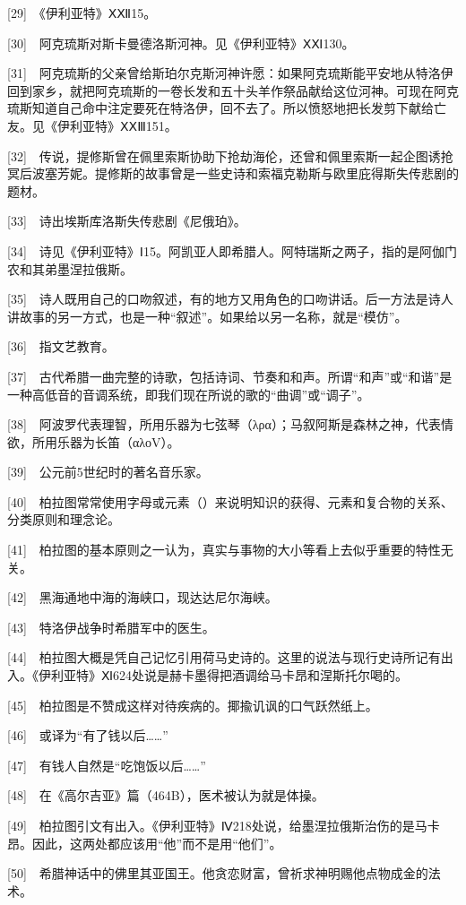 \documentclass[12pt,oneside]{book}
\begin{document}
[29]　《伊利亚特》ⅩⅫ15。

[30]　阿克琉斯对斯卡曼德洛斯河神。见《伊利亚特》ⅩⅪ130。

[31]　阿克琉斯的父亲曾给斯珀尔克斯河神许愿：如果阿克琉斯能平安地从特洛伊回到家乡，就把阿克琉斯的一卷长发和五十头羊作祭品献给这位河神。可现在阿克琉斯知道自己命中注定要死在特洛伊，回不去了。所以愤怒地把长发剪下献给亡友。见《伊利亚特》ⅩⅩⅢ151。

[32]　传说，提修斯曾在佩里索斯协助下抢劫海伦，还曾和佩里索斯一起企图诱抢冥后波塞芳妮。提修斯的故事曾是一些史诗和索福克勒斯与欧里庇得斯失传悲剧的题材。

[33]　诗出埃斯库洛斯失传悲剧《尼俄珀》。

[34]　诗见《伊利亚特》Ⅰ15。阿凯亚人即希腊人。阿特瑞斯之两子，指的是阿伽门农和其弟墨涅拉俄斯。

[35]　诗人既用自己的口吻叙述，有的地方又用角色的口吻讲话。后一方法是诗人讲故事的另一方式，也是一种“叙述”。如果给以另一名称，就是“模仿”。

[36]　指文艺教育。

[37]　古代希腊一曲完整的诗歌，包括诗词、节奏和和声。所谓“和声”或“和谐”是一种高低音的音调系统，即我们现在所说的歌的“曲调”或“调子”。

[38]　阿波罗代表理智，所用乐器为七弦琴（λρα）；马叙阿斯是森林之神，代表情欲，所用乐器为长笛（αλοV）。

[39]　公元前5世纪时的著名音乐家。

[40]　柏拉图常常使用字母或元素（）来说明知识的获得、元素和复合物的关系、分类原则和理念论。

[41]　柏拉图的基本原则之一认为，真实与事物的大小等看上去似乎重要的特性无关。

[42]　黑海通地中海的海峡口，现达达尼尔海峡。

[43]　特洛伊战争时希腊军中的医生。

[44]　柏拉图大概是凭自己记忆引用荷马史诗的。这里的说法与现行史诗所记有出入。《伊利亚特》Ⅺ624处说是赫卡墨得把酒调给马卡昂和涅斯托尔喝的。

[45]　柏拉图是不赞成这样对待疾病的。揶揄讥讽的口气跃然纸上。

[46]　或译为“有了钱以后……”

[47]　有钱人自然是“吃饱饭以后……”

[48]　在《高尔吉亚》篇（464B），医术被认为就是体操。

[49]　柏拉图引文有出入。《伊利亚特》Ⅳ218处说，给墨涅拉俄斯治伤的是马卡昂。因此，这两处都应该用“他”而不是用“他们”。

[50]　希腊神话中的佛里其亚国王。他贪恋财富，曾祈求神明赐他点物成金的法术。
\end{document}
